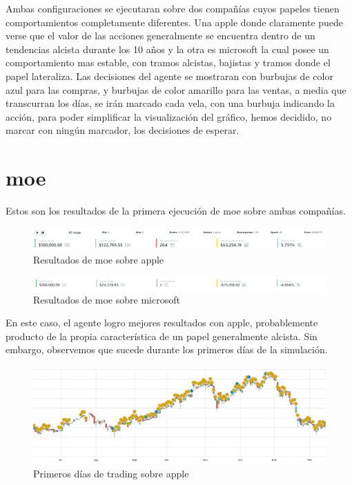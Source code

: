Ambas configuraciones se ejecutaran sobre dos compañías cuyos papeles tienen comportamientos completamente diferentes.
Una apple donde claramente puede verse que el valor de las acciones generalmente se encuentra dentro de un tendencias alcista durante los 10 años y la otra es microsoft la cual posee un comportamiento mas estable, con tramos alcistas, bajistas y tramos donde el papel lateraliza. Las decisiones del agente se mostraran con burbujas de color azul para las compras, y burbujas de color amarillo para las ventas, a media que transcurran los días, se irán marcado cada vela, con una burbuja indicando la acción, para poder simplificar la visualización del gráfico, hemos decidido, no marcar con ningún marcador, los decisiones de esperar.

\section{moe}

Estos son los resultados de la primera ejecución de moe sobre ambas compañías.

\begin{figure}[h!]
	\includegraphics[scale=0.5]{imagenes/moe_appl_ex1_1_summary.png}
	\caption{Resultados de moe sobre apple}
\end{figure}

\begin{figure}[h!]
	\includegraphics[scale=0.45]{imagenes/moe_msft_ex1_1_summary.png}
	\caption{Resultados de moe sobre microsoft}
\end{figure}

En este caso, el agente logro mejores resultados con apple, probablemente producto de la propia característica de un papel generalmente alcista.
Sin embargo, observemos que sucede durante los primeros días de la simulación.

\begin{figure}[h!]
	\includegraphics[scale=0.5]{imagenes/moe_appl_ex1_1.png}
	\caption{Primeros días de trading sobre apple}
\end{figure}


